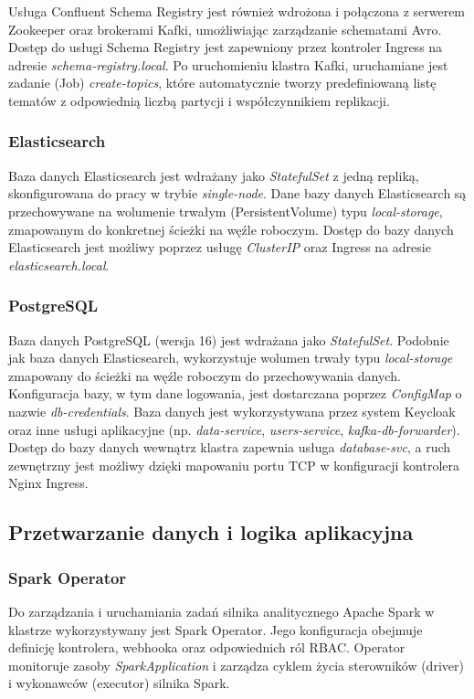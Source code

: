 Usługa Confluent Schema Registry jest również wdrożona i połączona z serwerem Zookeeper oraz brokerami Kafki, umożliwiając zarządzanie schematami Avro. Dostęp do usługi Schema Registry jest zapewniony przez kontroler Ingress na adresie \textit{schema-registry.local}. Po uruchomieniu klastra Kafki, uruchamiane jest zadanie (Job) \textit{create-topics}, które automatycznie tworzy predefiniowaną listę tematów z odpowiednią liczbą partycji i współczynnikiem replikacji.

\subsubsection{Elasticsearch}
Baza danych Elasticsearch jest wdrażany jako \textit{StatefulSet} z jedną repliką, skonfigurowana do pracy w trybie \textit{single-node}. Dane bazy danych Elasticsearch są przechowywane na wolumenie trwałym (PersistentVolume) typu \textit{local-storage}, zmapowanym do konkretnej ścieżki na węźle roboczym. Dostęp do bazy danych Elasticsearch jest możliwy poprzez usługę \textit{ClusterIP} oraz Ingress na adresie \textit{elasticsearch.local}.

\subsubsection{PostgreSQL}
Baza danych PostgreSQL (wersja 16) jest wdrażana jako \textit{StatefulSet}. Podobnie jak baza danych Elasticsearch, wykorzystuje wolumen trwały typu \textit{local-storage} zmapowany do ścieżki na węźle roboczym do przechowywania danych. Konfiguracja bazy, w tym dane logowania, jest dostarczana poprzez \textit{ConfigMap} o nazwie \textit{db-credentials}. Baza danych jest wykorzystywana przez system Keycloak oraz inne usługi aplikacyjne (np. \textit{data-service}, \textit{users-service}, \textit{kafka-db-forwarder}). Dostęp do bazy danych wewnątrz klastra zapewnia usługa \textit{database-svc}, a ruch zewnętrzny jest możliwy dzięki mapowaniu portu TCP w konfiguracji kontrolera Nginx Ingress.

\subsection{Przetwarzanie danych i logika aplikacyjna}

\subsubsection{Spark Operator}
Do zarządzania i uruchamiania zadań silnika analitycznego Apache Spark w klastrze wykorzystywany jest Spark Operator. Jego konfiguracja obejmuje definicję kontrolera, webhooka oraz odpowiednich ról RBAC. Operator monitoruje zasoby \textit{SparkApplication} i zarządza cyklem życia sterowników (driver) i wykonawców (executor) silnika Spark.

